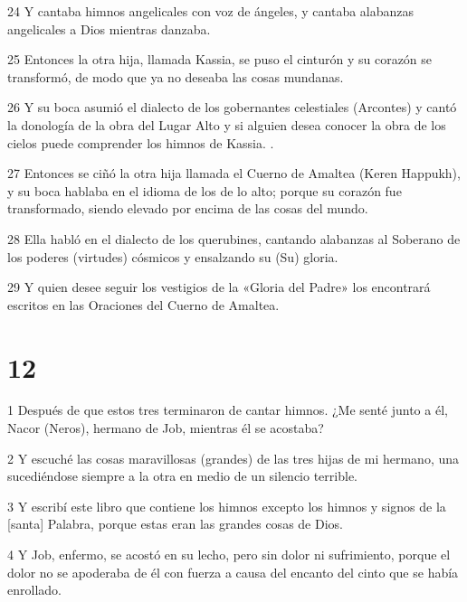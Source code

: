 \par 24 Y cantaba himnos angelicales con voz de ángeles, y cantaba alabanzas angelicales a Dios mientras danzaba.

\par 25 Entonces la otra hija, llamada Kassia, se puso el cinturón y su corazón se transformó, de modo que ya no deseaba las cosas mundanas.

\par 26 Y su boca asumió el dialecto de los gobernantes celestiales (Arcontes) y cantó la donología de la obra del Lugar Alto y si alguien desea conocer la obra de los cielos puede comprender los himnos de Kassia. .

\par 27 Entonces se ciñó la otra hija llamada el Cuerno de Amaltea (Keren Happukh), y su boca hablaba en el idioma de los de lo alto; porque su corazón fue transformado, siendo elevado por encima de las cosas del mundo.

\par 28 Ella habló en el dialecto de los querubines, cantando alabanzas al Soberano de los poderes (virtudes) cósmicos y ensalzando su (Su) gloria.

\par 29 Y quien desee seguir los vestigios de la «Gloria del Padre» los encontrará escritos en las Oraciones del Cuerno de Amaltea.

\chapter{12}

\par 1 Después de que estos tres terminaron de cantar himnos. ¿Me senté junto a él, Nacor (Neros), hermano de Job, mientras él se acostaba?

\par 2 Y escuché las cosas maravillosas (grandes) de las tres hijas de mi hermano, una sucediéndose siempre a la otra en medio de un silencio terrible.

\par 3 Y escribí este libro que contiene los himnos excepto los himnos y signos de la [santa] Palabra, porque estas eran las grandes cosas de Dios.

\par 4 Y Job, enfermo, se acostó en su lecho, pero sin dolor ni sufrimiento, porque el dolor no se apoderaba de él con fuerza a causa del encanto del cinto que se había enrollado.

